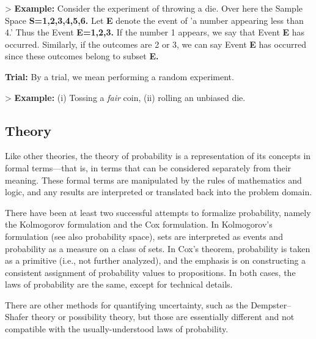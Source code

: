 > \textbf{Example:} Consider the experiment of throwing a die. Over here the Sample Space
\textbf{S={1,2,3,4,5,6}.} Let \textbf{E} denote the event of 'a number appearing less than
4.' Thus the Event \textbf{E={1,2,3}.} If the number 1 appears, we say that Event
\textbf{E} has occurred. Similarly, if the outcomes are 2 or 3, we can say Event
\textbf{E} has occurred since these outcomes belong to subset \textbf{E.}



\textbf{Trial:} By a trial, we mean performing a random experiment.



> \textbf{Example:} (i) Tossing a \textit{fair} coin, (ii) rolling an unbiased die.




\subsection{Theory}
\label{sss:theo-af54}




Like other theories, the theory of probability is a representation of its concepts in
formal terms---that is, in terms that can be considered separately from their meaning.
These formal terms are manipulated by the rules of mathematics and logic, and any results
are interpreted or translated back into the problem domain.



There have been at least two successful attempts to formalize probability, namely the
Kolmogorov formulation and the Cox formulation. In Kolmogorov's formulation (see also
probability space), sets are interpreted as events and probability as a measure on a class
of sets. In Cox's theorem, probability is taken as a primitive (i.e., not further
analyzed), and the emphasis is on constructing a consistent assignment of probability
values to propositions. In both cases, the laws of probability are the same, except for
technical details.



There are other methods for quantifying uncertainty, such as the Dempster--Shafer theory
or possibility theory, but those are essentially different and not compatible with the
usually-understood laws of probability.




